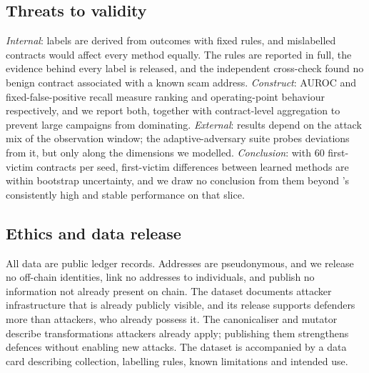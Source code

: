 \subsection{Threats to validity}
\emph{Internal}: labels are derived from outcomes with fixed rules, and mislabelled contracts would affect every method equally. The rules are reported in full, the evidence behind every label is released, and the independent cross-check found no benign contract associated with a known scam address. \emph{Construct}: AUROC and fixed-false-positive recall measure ranking and operating-point behaviour respectively, and we report both, together with contract-level aggregation to prevent large campaigns from dominating. \emph{External}: results depend on the attack mix of the observation window; the adaptive-adversary suite probes deviations from it, but only along the dimensions we modelled. \emph{Conclusion}: with $60$ first-victim contracts per seed, first-victim differences between learned methods are within bootstrap uncertainty, and we draw no conclusion from them beyond \dn{}'s consistently high and stable performance on that slice.

\subsection{Ethics and data release}
All data are public ledger records. Addresses are pseudonymous, and we release no off-chain identities, link no addresses to individuals, and publish no information not already present on chain. The dataset documents attacker infrastructure that is already publicly visible, and its release supports defenders more than attackers, who already possess it. The canonicaliser and mutator describe transformations attackers already apply; publishing them strengthens defences without enabling new attacks. The dataset is accompanied by a data card describing collection, labelling rules, known limitations and intended use.
